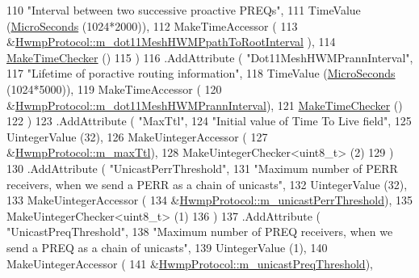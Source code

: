 \begin{DoxyCode}
110                     \textcolor{stringliteral}{"Interval between two successive proactive PREQs"},
111                     TimeValue (\hyperlink{group__timecivil_ga17465a639c8d1464e76538afdd78a9f0}{MicroSeconds} (1024*2000)),
112                     MakeTimeAccessor (
113                       &\hyperlink{classns3_1_1dot11s_1_1HwmpProtocol_ab01e8ec195410954227b273627e1d733}{HwmpProtocol::m\_dot11MeshHWMPpathToRootInterval}
      ),
114                     \hyperlink{group__time_ga7032965bd4afa578691d88c09e4481c1}{MakeTimeChecker} ()
115                     )
116     .AddAttribute ( \textcolor{stringliteral}{"Dot11MeshHWMPrannInterval"},
117                     \textcolor{stringliteral}{"Lifetime of poractive routing information"},
118                     TimeValue (\hyperlink{group__timecivil_ga17465a639c8d1464e76538afdd78a9f0}{MicroSeconds} (1024*5000)),
119                     MakeTimeAccessor (
120                       &\hyperlink{classns3_1_1dot11s_1_1HwmpProtocol_a253b285768b092f926638d9b517085f4}{HwmpProtocol::m\_dot11MeshHWMPrannInterval}),
121                     \hyperlink{group__time_ga7032965bd4afa578691d88c09e4481c1}{MakeTimeChecker} ()
122                     )
123     .AddAttribute ( \textcolor{stringliteral}{"MaxTtl"},
124                     \textcolor{stringliteral}{"Initial value of Time To Live field"},
125                     UintegerValue (32),
126                     MakeUintegerAccessor (
127                       &\hyperlink{classns3_1_1dot11s_1_1HwmpProtocol_aeb6a1f36357cb71cf8d41749f65a3edc}{HwmpProtocol::m\_maxTtl}),
128                     MakeUintegerChecker<uint8\_t> (2)
129                     )
130     .AddAttribute ( \textcolor{stringliteral}{"UnicastPerrThreshold"},
131                     \textcolor{stringliteral}{"Maximum number of PERR receivers, when we send a PERR as a chain of unicasts"},
132                     UintegerValue (32),
133                     MakeUintegerAccessor (
134                       &\hyperlink{classns3_1_1dot11s_1_1HwmpProtocol_aefbf7cb9cf17384c98b897048222fbf6}{HwmpProtocol::m\_unicastPerrThreshold}),
135                     MakeUintegerChecker<uint8\_t> (1)
136                     )
137     .AddAttribute ( \textcolor{stringliteral}{"UnicastPreqThreshold"},
138                     \textcolor{stringliteral}{"Maximum number of PREQ receivers, when we send a PREQ as a chain of unicasts"},
139                     UintegerValue (1),
140                     MakeUintegerAccessor (
141                       &\hyperlink{classns3_1_1dot11s_1_1HwmpProtocol_a3461bf4ea09ad4241bf000d499e46e02}{HwmpProtocol::m\_unicastPreqThreshold}),

\end{DoxyCode}
